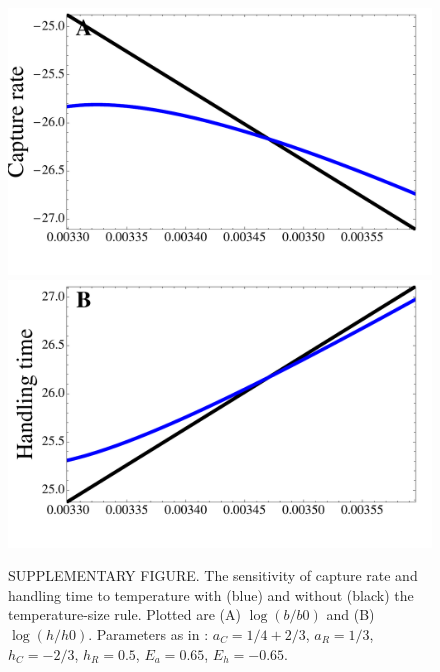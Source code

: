 \documentclass[11pt]{article}
\begin{document}
\begin{figure}[!ht]
\centering
\includegraphics[width=0.5\linewidth]{CaptureTSRAsymm}
\includegraphics[width=0.5\linewidth]{HandlingTSRAsymm}
\caption{
SUPPLEMENTARY FIGURE.
The sensitivity of capture rate and handling time to temperature with (blue) and without (black) the temperature-size rule.
Plotted are (A) $\log(b/b0)$ and (B) $\log(h/h0)$.
Parameters as in \cite{Rall2012}: $a_C = 1/4+2/3$, $a_R = 1/3$, $h_C = -2/3$, $h_R = 0.5$, $E_a = 0.65$, $E_h = -0.65$.
}
\label{CaptureTimeT}
\end{figure}
\end{document}
